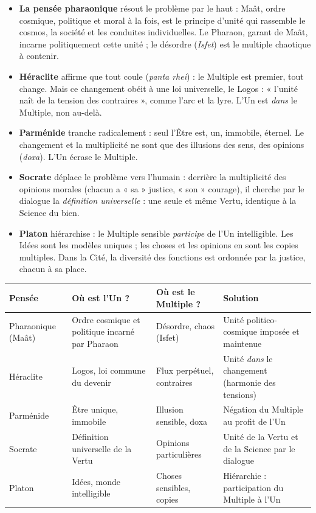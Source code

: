 \documentclass[11pt]{article}
\newcommand{\cle}[1]{{\popxbold\color{popdark}#1}}
\begin{document}
\begin{itemize}
\item \textbf{La pensée pharaonique} résout le problème par le haut : \cle{Maât}, ordre cosmique, politique et moral à la fois, est le principe d'unité qui rassemble le cosmos, la société et les conduites individuelles. Le Pharaon, garant de Maât, incarne politiquement cette unité ; le désordre (\emph{Isfet}) est le multiple chaotique à contenir.
\item \textbf{Héraclite} affirme que tout coule (\emph{panta rhei}) : le Multiple est premier, tout change. Mais ce changement obéit à une loi universelle, le \cle{Logos} : « l'unité naît de la tension des contraires », comme l'arc et la lyre. L'Un est \emph{dans} le Multiple, non au-delà.
\item \textbf{Parménide} tranche radicalement : seul l'\cle{Être} est, un, immobile, éternel. Le changement et la multiplicité ne sont que des illusions des sens, des opinions (\emph{doxa}). L'Un écrase le Multiple.
\item \textbf{Socrate} déplace le problème vers l'humain : derrière la multiplicité des opinions morales (chacun a « sa » justice, « son » courage), il cherche par le dialogue la \emph{définition universelle} : une seule et même Vertu, identique à la Science du bien.
\item \textbf{Platon} hiérarchise : le Multiple sensible \emph{participe} de l'Un intelligible. Les Idées sont les modèles uniques ; les choses et les opinions en sont les copies multiples. Dans la Cité, la diversité des fonctions est ordonnée par la justice, chacun à sa place.
\end{itemize}

\begin{center}
\begin{tabularx}{\linewidth}{|l|X|X|X|}
\hline
\rowcolor{popblueL} \textbf{Pensée} & \textbf{Où est l'Un ?} & \textbf{Où est le Multiple ?} & \textbf{Solution} \\
\hline
Pharaonique (Maât) & Ordre cosmique et politique incarné par Pharaon & Désordre, chaos (Isfet) & Unité politico-cosmique imposée et maintenue \\
\hline
Héraclite & Logos, loi commune du devenir & Flux perpétuel, contraires & Unité \emph{dans} le changement (harmonie des tensions) \\
\hline
Parménide & Être unique, immobile & Illusion sensible, doxa & Négation du Multiple au profit de l'Un \\
\hline
Socrate & Définition universelle de la Vertu & Opinions particulières & Unité de la Vertu et de la Science par le dialogue \\
\hline
Platon & Idées, monde intelligible & Choses sensibles, copies & Hiérarchie : participation du Multiple à l'Un \\
\hline
\end{tabularx}
\end{center}
\end{document}
